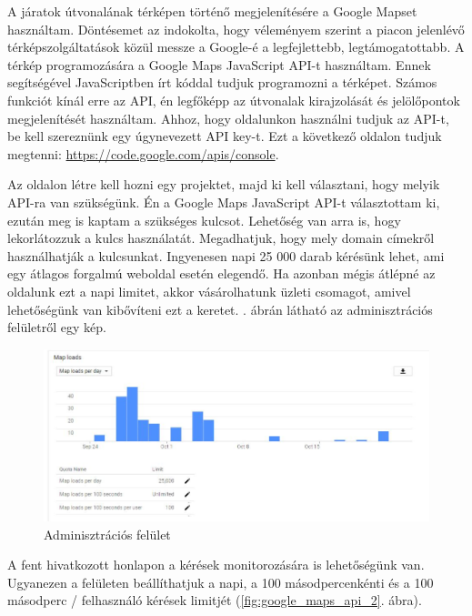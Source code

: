 
A járatok útvonalának térképen történő megjelenítésére a Google Mapset használtam. Döntésemet az indokolta, hogy véleményem szerint a piacon jelenlévő térképszolgáltatások közül messze a Google-é a legfejlettebb, legtámogatottabb. A térkép programozására a Google Maps JavaScript API-t használtam. Ennek segítségével JavaScriptben írt kóddal tudjuk programozni a térképet. Számos funkciót kínál erre az API, én legfőképp az útvonalak kirajzolását és jelölőpontok megjelenítését használtam. Ahhoz, hogy oldalunkon használni tudjuk az API-t, be kell szereznünk egy úgynevezett API key-t. Ezt a következő oldalon tudjuk megtenni: \url{https://code.google.com/apis/console}.

Az oldalon létre kell hozni egy projektet, majd ki kell választani, hogy melyik API-ra van szükségünk. Én a Google Maps JavaScript API-t választottam ki, ezután meg is kaptam a szükséges kulcsot. Lehetőség van arra is, hogy lekorlátozzuk a kulcs használatát. Megadhatjuk, hogy mely domain címekről használhatják a kulcsunkat. Ingyenesen napi 25 000 darab kérésünk lehet, ami egy átlagos forgalmú weboldal esetén elegendő. Ha azonban mégis átlépné az oldalunk ezt a napi limitet, akkor vásárolhatunk üzleti csomagot, amivel lehetőségünk van kibővíteni ezt a keretet. . ábrán látható az adminisztrációs felületről egy kép.

\begin{figure}[h!]
\centering
\includegraphics[scale=0.5]{kepek/google_maps_api_1.jpg}
\caption{Adminisztrációs felület}
\label{fig:google_maps_api_1}
\end{figure}

A fent hivatkozott honlapon a kérések monitorozására is lehetőségünk van. Ugyanezen a felületen beállíthatjuk a napi, a 100 másodpercenkénti és a 100 másodperc / felhasználó kérések limitjét (\ref{fig:google_maps_api_2}. ábra).

